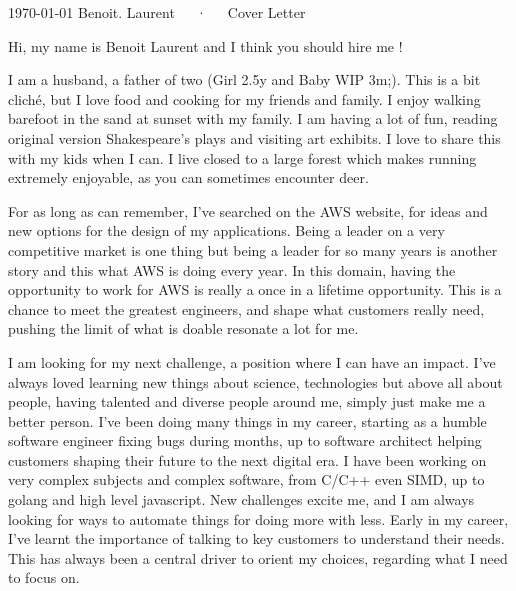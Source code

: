 \documentclass[11pt, a4paper]{awesome-cv}
\begin{document}
\makecvheader[R]

\makecvfooter
  {\today}
  {Benoit. Laurent~~~·~~~Cover Letter}
  {}

\makelettertitle

\begin{cvletter}

Hi, my name is Benoit Laurent and I think you should hire me !

I am a husband, a father of two (Girl 2.5y and Baby WIP 3m;). This is a bit cliché, but I love food and cooking for my friends and family. I enjoy walking barefoot in the sand at sunset with my family.
I am having a lot of fun, reading original version Shakespeare's plays and visiting art exhibits. I love to share this with my kids when I can.
I live closed to a large forest which makes running extremely enjoyable, as you can sometimes encounter deer.

For as long as can remember, I've searched on the AWS website, for ideas and new options for the design of my applications. Being a leader on a very competitive market is one thing but being a leader for so many years is another story and this what AWS is doing every year. In this domain, having the opportunity to work for AWS is really a once in a lifetime opportunity. This is a chance to meet the greatest engineers, and shape what customers really need, pushing the limit of what is doable resonate a lot for me.

I am looking for my next challenge, a position where I can have an impact. I've always loved learning new things about science, technologies but above all about people, having talented and diverse people around me, simply just make me a better person.
I've been doing many things in my career, starting as a humble software engineer fixing bugs during months, up to software architect helping customers shaping their future to the next digital era. I have been working on very complex subjects and complex software, from C/C++ even SIMD, up to golang and high level javascript.
New challenges excite me, and I am always looking for ways to automate things for doing more with less.
Early in my career, I've learnt the importance of talking to key customers to understand their needs. This has always been a central driver to orient my choices, regarding what I need to focus on.

\end{cvletter}

\makeletterclosing
\end{document}
